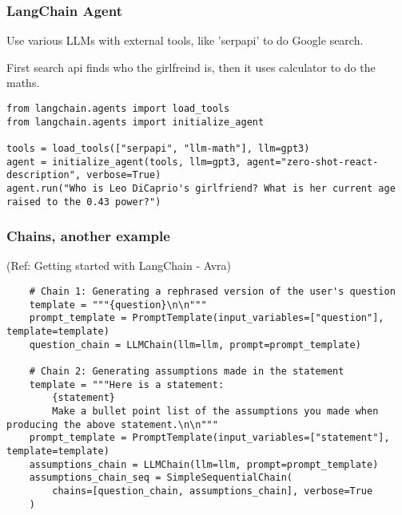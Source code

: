 \begin{frame}[fragile]\frametitle{LangChain Agent}

Use various LLMs with external tools, like 'serpapi' to do Google search.

First search api finds who the girlfreind is, then it uses calculator to do the maths.

\begin{lstlisting}
from langchain.agents import load_tools
from langchain.agents import initialize_agent

tools = load_tools(["serpapi", "llm-math"], llm=gpt3)
agent = initialize_agent(tools, llm=gpt3, agent="zero-shot-react-description", verbose=True)
agent.run("Who is Leo DiCaprio's girlfriend? What is her current age raised to the 0.43 power?")
\end{lstlisting}	  

\end{frame}

\begin{frame}[fragile]\frametitle{Chains, another example}

{\tiny (Ref: Getting started with LangChain - Avra)}


\begin{lstlisting}
    # Chain 1: Generating a rephrased version of the user's question
    template = """{question}\n\n"""
    prompt_template = PromptTemplate(input_variables=["question"], template=template)
    question_chain = LLMChain(llm=llm, prompt=prompt_template)

    # Chain 2: Generating assumptions made in the statement
    template = """Here is a statement:
        {statement}
        Make a bullet point list of the assumptions you made when producing the above statement.\n\n"""
    prompt_template = PromptTemplate(input_variables=["statement"], template=template)
    assumptions_chain = LLMChain(llm=llm, prompt=prompt_template)
    assumptions_chain_seq = SimpleSequentialChain(
        chains=[question_chain, assumptions_chain], verbose=True
    )

\end{lstlisting}

\end{frame}

